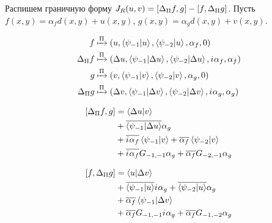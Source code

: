 Распишем граничную форму $J_R(u, v) = [\Delta_\Pi f,g] - [f,\Delta_\Pi g]$. Пусть $f(x, y) = \alpha_f d(x, y) + u(x, y)$, $g(x, y) = \alpha_g d(x, y) + v(x, y)$.

\begin{align*}
f            & \xmapsto[]{\Pi} \Vector{u, \ip{\psi_{-1}}{u}, \ip{\psi_{-2}}{u}, \alpha_f, 0} \\
\Delta_\Pi f & \xmapsto[]{\Pi} \Vector{\Delta u, \ip{\psi_{-1}}{\Delta u}, \ip{\psi_{-2}}{\Delta u}, \iu \alpha_f, \alpha_f} \\
g            & \xmapsto[]{\Pi} \Vector{v, \ip{\psi_{-1}}{v}, \ip{\psi_{-2}}{v}, \alpha_g, 0} \\
\Delta_\Pi g & \xmapsto[]{\Pi} \Vector{\Delta v, \ip{\psi_{-1}}{\Delta v}, \ip{\psi_{-2}}{\Delta v}, \iu \alpha_g, \alpha_g}
\end{align*}

\begin{align*}
\iip{\Delta_\Pi f}{g}
&= \ip{\Delta u}{v} \\
&+ \cconj{\ip{\psi_{-1}}{\Delta u}} \alpha_g \\
&+ \cconj{\iu \alpha_f} \ip{\psi_{-1}}{v} + \cconj{\alpha_f} \ip{\psi_{-2}}{v} \\
&+ \cconj{\iu \alpha_f} G_{-1, -1} \alpha_g + \cconj{\alpha_f} G_{-2, -1} \alpha_g 
\end{align*}

\begin{align*}
\iip{f}{\Delta_\Pi  g}
&= \ip{u}{\Delta v} \\
&+ \cconj{\ip{\psi_{-1}}{u}} \iu \alpha_g + \cconj{\ip{\psi_{-2}}{u}} \alpha_g \\
&+ \cconj{\alpha_f} \ip{\psi_{-1}}{\Delta v} \\
&+ \cconj{\alpha_f} G_{-1, -1} \iu \alpha_g + \cconj{\alpha_f} G_{-1, -2} \alpha_g 
\end{align*}


